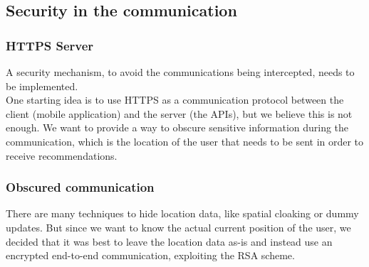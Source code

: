 \documentclass[../../main]{subfiles}
\begin{document}
\subsection{Security in the communication}
\label{ss:security-in-communication}

\subsubsection{HTTPS Server}
A security mechanism, to avoid the communications being intercepted, needs to be implemented.\\
One starting idea is to use HTTPS as a communication protocol between the client (mobile application) and the server (the APIs), but we believe this is not enough.
We want to provide a way to obscure sensitive information during the communication, which is the location of the user that needs to be sent in order to receive recommendations.
\subsubsection{Obscured communication}
There are many techniques to hide location data, like spatial cloaking or dummy updates.
But since we want to know the actual current position of the user, we decided that it was best to leave the location data as-is and instead use an encrypted end-to-end communication, exploiting the RSA scheme.
\end{document}
